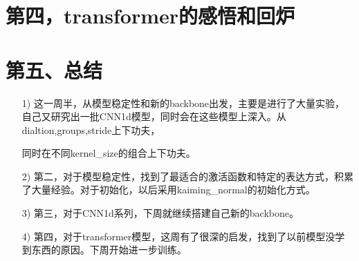 \documentclass[11pt]{ctexart}
\begin{document}
\section{第四，transformer的感悟和回炉}
\fi %

\section{第五、总结}
\begin{itemize}
  \item [1)]
  这一周半，从模型稳定性和新的backbone出发，主要是进行了大量实验，自己又研究出一批CNN1d模型，同时会在这些模型上深入。从dialtion,groups,stride上下功夫，\par 同时在不同kernel\_size的组合上下功夫。
  \item [2)]
  第二，对于模型稳定性，找到了最适合的激活函数和特定的表达方式，积累了大量经验。对于初始化，以后采用kaiming\_normal的初始化方式。
  \item [3)]
  第三，对于CNN1d系列，下周就继续搭建自己新的backbone。
  \item [4)]
  第四，对于transformer模型，这周有了很深的启发，找到了以前模型没学到东西的原因。下周开始进一步训练。
\end{itemize}
\end{document}
